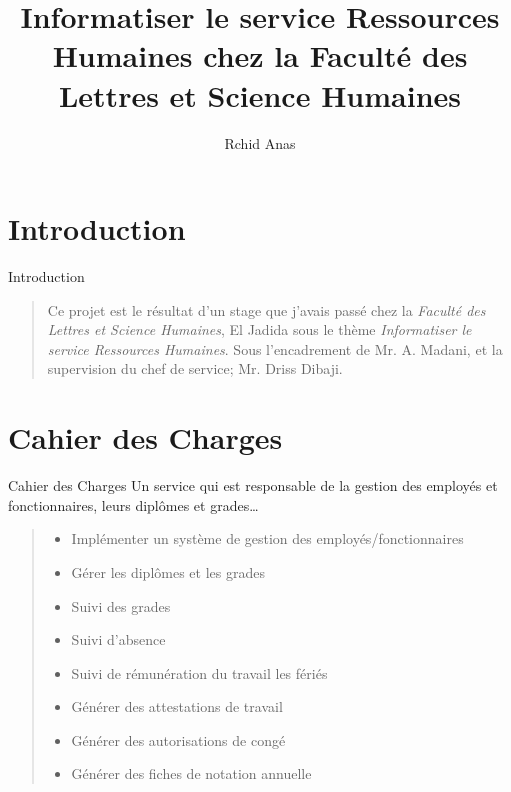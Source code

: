 \documentclass[captions=tableheading]{beamer}
\author{Rchid Anas}
\date{}
\title{Informatiser le service Ressources Humaines chez la Faculté des Lettres et Science Humaines}
\begin{document}
\maketitle
\tableofcontents
\clearpage

\section{Introduction}
\label{sec:org98b21ab}
\begin{frame}[label={sec:orgd43bd1d}]{Introduction}
\begin{quote}
Ce projet est le résultat d'un stage que j'avais passé chez la \emph{Faculté des Lettres et Science Humaines}, El Jadida sous le thème \emph{Informatiser le service Ressources Humaines}. Sous l'encadrement de Mr. A. Madani, et la supervision du chef de service; Mr. Driss Dibaji.\\
\end{quote}
\end{frame}

\section{Cahier des Charges}
\label{sec:org63e5b2e}
\begin{frame}[label={sec:org421f763}]{Cahier des Charges}
Un service qui est responsable de la gestion des employés et fonctionnaires, leurs diplômes et grades\ldots{}\\
\pause

\begin{quote}
\begin{itemize}
\item Implémenter un système de gestion des employés/fonctionnaires \pause
\item Gérer les diplômes et les grades \pause
\item Suivi des grades \pause
\item Suivi d'absence \pause
\item Suivi de rémunération du travail les fériés \pause
\item Générer des attestations de travail \pause
\item Générer des autorisations de congé \pause
\item Générer des fiches de notation annuelle
\end{itemize}
\end{quote}
\end{frame}
\end{document}
